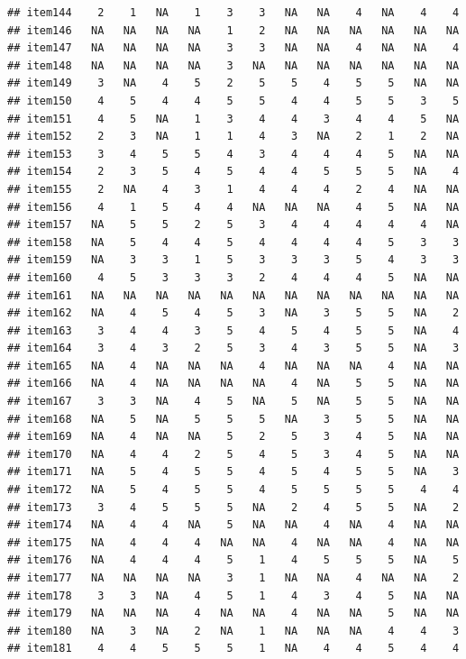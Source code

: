 \documentclass[
  man]{apa6}
\begin{document}
\begin{verbatim}
## item144    2    1   NA    1    3    3   NA   NA    4   NA    4    4
## item146   NA   NA   NA   NA    1    2   NA   NA   NA   NA   NA   NA
## item147   NA   NA   NA   NA    3    3   NA   NA    4   NA   NA    4
## item148   NA   NA   NA   NA    3   NA   NA   NA   NA   NA   NA   NA
## item149    3   NA    4    5    2    5    5    4    5    5   NA   NA
## item150    4    5    4    4    5    5    4    4    5    5    3    5
## item151    4    5   NA    1    3    4    4    3    4    4    5   NA
## item152    2    3   NA    1    1    4    3   NA    2    1    2   NA
## item153    3    4    5    5    4    3    4    4    4    5   NA   NA
## item154    2    3    5    4    5    4    4    5    5    5   NA    4
## item155    2   NA    4    3    1    4    4    4    2    4   NA   NA
## item156    4    1    5    4    4   NA   NA   NA    4    5   NA   NA
## item157   NA    5    5    2    5    3    4    4    4    4    4   NA
## item158   NA    5    4    4    5    4    4    4    4    5    3    3
## item159   NA    3    3    1    5    3    3    3    5    4    3    3
## item160    4    5    3    3    3    2    4    4    4    5   NA   NA
## item161   NA   NA   NA   NA   NA   NA   NA   NA   NA   NA   NA   NA
## item162   NA    4    5    4    5    3   NA    3    5    5   NA    2
## item163    3    4    4    3    5    4    5    4    5    5   NA    4
## item164    3    4    3    2    5    3    4    3    5    5   NA    3
## item165   NA    4   NA   NA   NA    4   NA   NA   NA    4   NA   NA
## item166   NA    4   NA   NA   NA   NA    4   NA    5    5   NA   NA
## item167    3    3   NA    4    5   NA    5   NA    5    5   NA   NA
## item168   NA    5   NA    5    5    5   NA    3    5    5   NA   NA
## item169   NA    4   NA   NA    5    2    5    3    4    5   NA   NA
## item170   NA    4    4    2    5    4    5    3    4    5   NA   NA
## item171   NA    5    4    5    5    4    5    4    5    5   NA    3
## item172   NA    5    4    5    5    4    5    5    5    5    4    4
## item173    3    4    5    5    5   NA    2    4    5    5   NA    2
## item174   NA    4    4   NA    5   NA   NA    4   NA    4   NA   NA
## item175   NA    4    4    4   NA   NA    4   NA   NA    4   NA   NA
## item176   NA    4    4    4    5    1    4    5    5    5   NA    5
## item177   NA   NA   NA   NA    3    1   NA   NA    4   NA   NA    2
## item178    3    3   NA    4    5    1    4    3    4    5   NA   NA
## item179   NA   NA   NA    4   NA   NA    4   NA   NA    5   NA   NA
## item180   NA    3   NA    2   NA    1   NA   NA   NA    4    4    3
## item181    4    4    5    5    5    1   NA    4    4    5    4    4

\end{verbatim}
\end{document}
